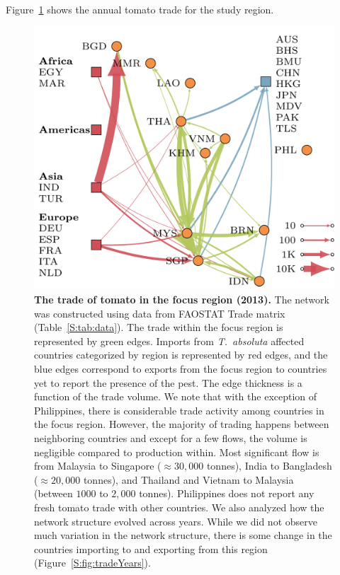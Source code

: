 \documentclass[11pt]{article}
\newcommand{\tuta}{\emph{T.~absoluta}}
\newcommand{\mooreRange}{r_\mathrm{M}}
\theoremstyle{definition}
\begin{document}
 Figure~\ref{fig:tomnet} shows the
annual tomato trade for the study region.
\begin{figure}[t]
\centering
\includegraphics[width=.6\textwidth]{../international_trade/results/network_plots/sea_2013_tomato.pdf}
\caption{\textbf{The trade of tomato in the focus region (2013).} The
network was constructed using data from FAOSTAT Trade matrix
(Table~\ref{S:tab:data}).  The trade within the focus region is represented
by green edges. Imports from \tuta{} affected countries categorized by
region is represented by red edges, and the blue edges correspond to
exports from the focus region to countries yet to report the presence of
the pest. The edge thickness is a function of the trade volume. We note
that with the exception of Philippines, there is considerable trade
activity among countries in the focus region. However, the majority of
trading happens between neighboring countries and except for a few flows,
the volume is negligible compared to production within. Most significant
flow is from Malaysia to Singapore ($\approx30,000$ tonnes), India to
Bangladesh ($\approx20,000$ tonnes), and Thailand and Vietnam to Malaysia
(between $1000$ to $2,000$ tonnes). Philippines does not report any fresh
tomato trade with other countries.  We also analyzed how the network
structure evolved across years. While we did not observe much variation in
the network structure, there is some change in the countries importing to
and exporting from this region
(Figure~\ref{S:fig:tradeYears}).\label{fig:tomnet}}
\end{figure}
\end{document}
